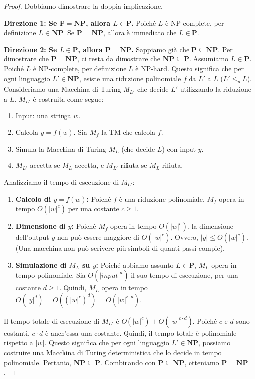 \documentclass[a4paper]{article}
\begin{document}
\begin{proof}
Dobbiamo dimostrare la doppia implicazione.

\textbf{Direzione 1: Se $\mathbf{P} = \mathbf{NP}$, allora $L \in \mathbf{P}$.}
Poiché $L$ è NP-complete, per definizione $L \in \mathbf{NP}$. Se $\mathbf{P} = \mathbf{NP}$, allora è immediato che $L \in \mathbf{P}$.

\textbf{Direzione 2: Se $L \in \mathbf{P}$, allora $\mathbf{P} = \mathbf{NP}$.}
Sappiamo già che $\mathbf{P} \subseteq \mathbf{NP}$. Per dimostrare che $\mathbf{P} = \mathbf{NP}$, ci resta da dimostrare che $\mathbf{NP} \subseteq \mathbf{P}$.
Assumiamo $L \in \mathbf{P}$.
Poiché $L$ è NP-complete, per definizione $L$ è NP-hard.
Questo significa che per ogni linguaggio $L' \in \mathbf{NP}$, esiste una riduzione polinomiale $f$ da $L'$ a $L$ ($L' \le_p L$).
Consideriamo una Macchina di Turing $M_{L'}$ che decide $L'$ utilizzando la riduzione a $L$. $M_{L'}$ è costruita come segue:
\begin{enumerate}
    \item Input: una stringa $w$.
    \item Calcola $y = f(w)$. Sia $M_f$ la TM che calcola $f$.
    \item Simula la Macchina di Turing $M_L$ (che decide $L$) con input $y$.
    \item $M_{L'}$ accetta se $M_L$ accetta, e $M_{L'}$ rifiuta se $M_L$ rifiuta.
\end{enumerate}

Analizziamo il tempo di esecuzione di $M_{L'}$:
\begin{enumerate}
    \item \textbf{Calcolo di $y = f(w)$:} Poiché $f$ è una riduzione polinomiale, $M_f$ opera in tempo $O(|w|^c)$ per una costante $c \ge 1$.
    \item \textbf{Dimensione di $y$:} Poiché $M_f$ opera in tempo $O(|w|^c)$, la dimensione dell'output $y$ non può essere maggiore di $O(|w|^c)$. Ovvero, $|y| \le O(|w|^c)$. (Una macchina non può scrivere più simboli di quanti passi compie).
    \item \textbf{Simulazione di $M_L$ su $y$:} Poiché abbiamo assunto $L \in \mathbf{P}$, $M_L$ opera in tempo polinomiale. Sia $O(|input|^d)$ il suo tempo di esecuzione, per una costante $d \ge 1$.
    Quindi, $M_L$ opera in tempo $O(|y|^d) = O((|w|^c)^d) = O(|w|^{c \cdot d})$.
\end{enumerate}
Il tempo totale di esecuzione di $M_{L'}$ è $O(|w|^c) + O(|w|^{c \cdot d})$. Poiché $c$ e $d$ sono costanti, $c \cdot d$ è anch'essa una costante. Quindi, il tempo totale è polinomiale rispetto a $|w|$.
Questo significa che per ogni linguaggio $L' \in \mathbf{NP}$, possiamo costruire una Macchina di Turing deterministica che lo decide in tempo polinomiale.
Pertanto, $\mathbf{NP} \subseteq \mathbf{P}$.
Combinando con $\mathbf{P} \subseteq \mathbf{NP}$, otteniamo $\mathbf{P} = \mathbf{NP}$.
\end{proof}
\end{document}
